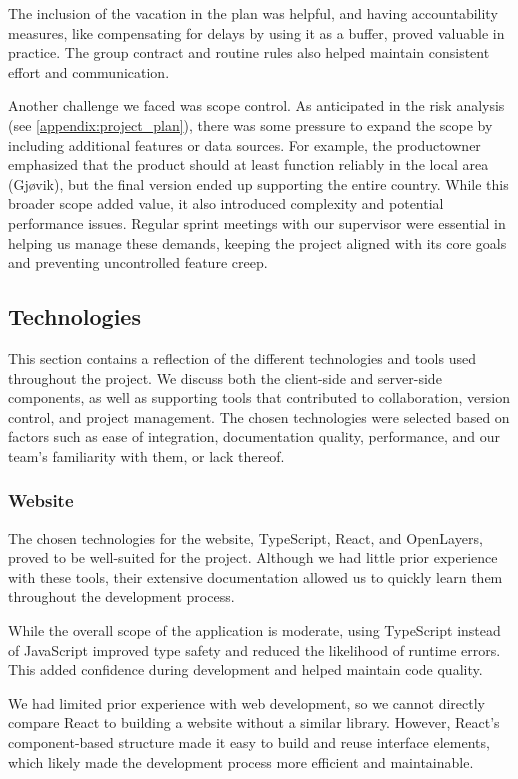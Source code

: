The inclusion of the vacation in the plan was helpful, and having accountability measures, like compensating for delays by using it as a buffer, proved valuable in practice. The group contract and routine rules also helped maintain consistent effort and communication.

Another challenge we faced was scope control. As anticipated in the risk analysis (see \autoref{appendix:project_plan}), there was some pressure to expand the scope by including additional features or data sources. For example, the \gls{productowner} emphasized that the product should at least function reliably in the local area (Gjøvik), but the final version ended up supporting the entire country. While this broader scope added value, it also introduced complexity and potential performance issues. Regular sprint meetings with our supervisor were essential in helping us manage these demands, keeping the project aligned with its core goals and preventing uncontrolled feature creep.

\subsection{Technologies}

This section contains a reflection of the different technologies and tools used throughout the project. We discuss both the client-side and server-side components, as well as supporting tools that contributed to collaboration, version control, and project management. The chosen technologies were selected based on factors such as ease of integration, documentation quality, performance, and our team's familiarity with them, or lack thereof.

\subsubsection{Website}

The chosen technologies for the website, TypeScript, React, and OpenLayers, proved to be well-suited for the project. Although we had little prior experience with these tools, their extensive documentation allowed us to quickly learn them throughout the development process.

While the overall scope of the application is moderate, using TypeScript instead of JavaScript improved type safety and reduced the likelihood of runtime errors. This added confidence during development and helped maintain code quality.

We had limited prior experience with web development, so we cannot directly compare React to building a website without a similar library. However, React's component-based structure made it easy to build and reuse interface elements, which likely made the development process more efficient and maintainable.

